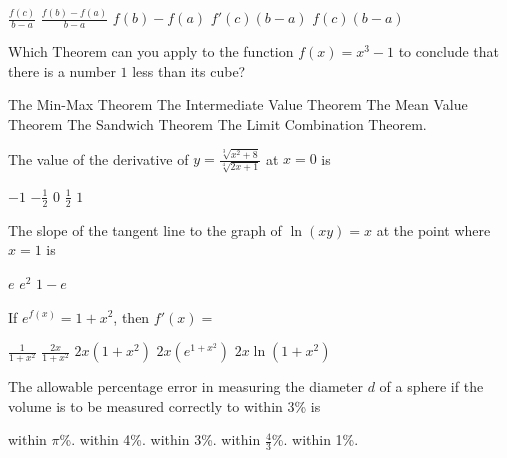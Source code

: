 \begin{questions}
    \begin{oneparchoices}
    \choice $\frac{f(c)}{b - a}$
    \choice $\frac{f(b) - f(a)}{b - a}$
    \choice $f(b) - f(a)$
    \choice $f'(c)(b - a)$
    \CorrectChoice $f(c)(b - a)$
    \end{oneparchoices}

\question[2] Which Theorem can you apply to the function $f(x) = x^3 -
    1$ to conclude that there is a number $1$ less than its cube?
    \begin{oneparchoices}
    \choice The Min-Max Theorem
    \CorrectChoice The Intermediate Value Theorem
    \choice The Mean Value Theorem
    \choice The Sandwich Theorem
    \choice The Limit Combination Theorem.
    \end{oneparchoices}

\question[2] The value of the derivative of $y = \frac{\sqrt[3]{x^2 +
    8}}{\sqrt[4]{2x + 1}}$ at $x = 0$ is

    \begin{oneparchoices}
    \CorrectChoice $-1$
    \choice $-\frac{1}{2}$
    \choice $0$
    \choice $\frac{1}{2}$
    \choice $1$
    \end{oneparchoices}

\question[2] The slope of the tangent line to the graph of $\ln(xy) =
    x$ at the point where $x = 1$ is

    \begin{oneparchoices}
    \choice $e$
    \choice $e^2$
    \choice $1 - e$
    \end{oneparchoices}

\question[2] If $e^{f(x)} = 1 + x^2$, then $f'(x) = $

    \begin{oneparchoices}
    \choice $\frac{1}{1 + x^2}$
    \CorrectChoice $\frac{2x}{1 + x^2}$
    \choice $2x(1 + x^2)$
    \choice $2x(e^{1 + x^2})$
    \choice $2x\ln(1 + x^2)$
    \end{oneparchoices}

\question[2]  The allowable percentage error in measuring the diameter
    $d$ of a sphere if the volume is to be measured correctly to
    within 3\% is

    \begin{oneparchoices}
    \choice within $\pi$\%.
    \choice within 4\%.
    \choice within 3\%.
    \choice within $\frac{4}{3}$\%.
    \CorrectChoice within 1\%.
    \end{oneparchoices}


\end{questions}
